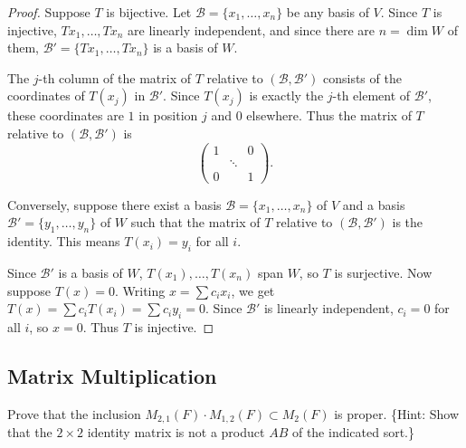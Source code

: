 \begin{proof}
    Suppose $T$ is bijective. Let $\mathcal{B} = \{x_1, \ldots, x_n\}$ be any basis of $V$.
    Since $T$ is injective, $Tx_1, \ldots, Tx_n$ are linearly independent, and since
    there are $n = \dim W$ of them, $\mathcal{B}' = \{Tx_1, \ldots, Tx_n\}$ is a basis of $W$.

    The $j$-th column of the matrix of $T$ relative to $(\mathcal{B}, \mathcal{B}')$
    consists of the coordinates of $T(x_j)$ in $\mathcal{B}'$. Since $T(x_j)$ is
    exactly the $j$-th element of $\mathcal{B}'$, these coordinates are $1$ in
    position $j$ and $0$ elsewhere. Thus the matrix of $T$ relative to $(\mathcal{B}, \mathcal{B}')$ is
    \[
    \begin{pmatrix} 1 & & 0 \\ & \ddots & \\ 0 & & 1 \end{pmatrix}.
    \]

    Conversely, suppose there exist a basis $\mathcal{B} = \{x_1, \ldots, x_n\}$ of $V$
    and a basis $\mathcal{B}' = \{y_1, \ldots, y_n\}$ of $W$
    such that the matrix of $T$ relative to $(\mathcal{B}, \mathcal{B}')$ is the identity.
    This means $T(x_i) = y_i$ for all $i$.

    Since $\mathcal{B}'$ is a basis of $W$, $T(x_1), \ldots, T(x_n)$ span $W$, so $T$ is surjective.
    Now suppose $T(x) = 0$. Writing $x = \sum c_i x_i$, we get
    $T(x) = \sum c_i T(x_i) = \sum c_i y_i = 0$.
    Since $\mathcal{B}'$ is linearly independent, $c_i = 0$ for all $i$, so $x = 0$.
    Thus $T$ is injective.
\end{proof}

\subsection{Matrix Multiplication}

\begin{tcolorbox}[title=Exercise 1, breakable]
    Prove that the inclusion $M_{2,1}(F) \cdot M_{1,2}(F) \subset M_2(F)$ is proper.
    \{Hint: Show that the $2 \times 2$ identity matrix is not a product $AB$ of the indicated sort.\}
\end{tcolorbox}


